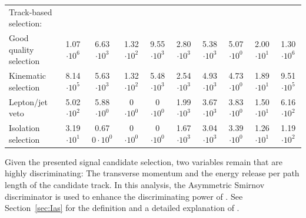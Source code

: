 \begin{table}
{\begin{tabular}{|l|c|c|c|c|c|c|c|c|c|}
Track-based selection:                                                                    
& & & & & & & & & \\
Good quality selection                                                                    & 1.07 $\cdot10^{6 }$ & 6.63 $\cdot10^{3 }$ & 1.32 $\cdot10^{2 }$ & 9.55 $\cdot10^{3 }$ & 2.80 $\cdot10^{3 }$ & 5.38 $\cdot10^{3 }$ & 5.07 $\cdot10^{0 }$ & 2.00 $\cdot10^{1 }$ & 1.30 $\cdot10^{6 }$ \\
Kinematic selection                                                                       & 8.14 $\cdot10^{5 }$ & 5.63 $\cdot10^{3 }$ & 1.32 $\cdot10^{2 }$ & 5.48 $\cdot10^{3 }$ & 2.54 $\cdot10^{3 }$ & 4.93 $\cdot10^{3 }$ & 4.73 $\cdot10^{0 }$ & 1.89 $\cdot10^{1 }$ & 9.51 $\cdot10^{5 }$ \\
Lepton/jet veto                                                                           & 5.02 $\cdot10^{2 }$ & 5.88 $\cdot10^{0 }$ & 0 $\cdot10^{0}$ & 0 $\cdot10^{0}$ & 1.99 $\cdot10^{3 }$ & 3.67 $\cdot10^{3 }$ & 3.83 $\cdot10^{0 }$ & 1.50 $\cdot10^{1 }$ & 6.16 $\cdot10^{2 }$ \\
Isolation selection                                                                       & 3.19 $\cdot10^{1 }$ & 0.67 $0\cdot10^{0 }$ & 0 $\cdot10^{0}$ & 0 $\cdot10^{0}$ & 1.67 $\cdot10^{3 }$ & 3.04 $\cdot10^{3 }$ & 3.39 $\cdot10^{0 }$ & 1.26 $\cdot10^{1 }$ & 1.19 $\cdot10^{2 }$ \\
\bottomrule
\end{tabular}}
\end{table}


Given the presented signal candidate selection, two variables remain that are highly discriminating:
The transverse momentum \pt and the energy release per path length \dedx of the candidate track.
In this analysis, the Asymmetric Smirnov discriminator \ias is used to enhance the discriminating power of \dedx.
See Section~\ref{sec:Ias} for the definition and a detailed explanation of \ias.

